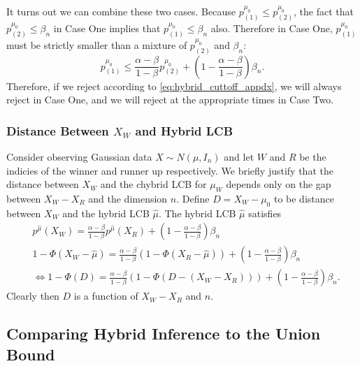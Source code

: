 \documentclass{article}
\begin{document}
\begin{appendix}
It turns out we can combine these two cases. Because $p^{\mu_0}_{(1)} \leq p^{\mu_0}_{(2)}$, the fact that $p^{\mu_0}_{(2)} \leq  \beta_n$ in Case One implies that $p^{\mu_0}_{(1)} \leq \beta_n$ also. Therefore in Case One, $p^{\mu_0}_{(1)}$ must be strictly smaller than a mixture of $p^{\mu_0}_{(2)}$ and $\beta_n$:
\begin{equation}
    \label{eq:hybrid_cuttoff_appdx}
    p^{\mu_0}_{(1)} \leq  \frac{\alpha-\beta}{1-\beta}p^{\mu_0}_{(2)}  + \left(1 - \frac{\alpha - \beta}{1 - \beta}\right)\beta_n. 
\end{equation}
Therefore, if we reject according to \eqref{eq:hybrid_cuttoff_appdx}, we will always reject in Case One, and we will reject at the appropriate times in Case Two. 

\subsubsection{Distance Between $X_W$ and Hybrid LCB}
\label{sec:hybrid_gap_appdx}

Consider observing Gaussian data $X \sim N(\mu, I_n)$ and let $W$ and $R$ be the indicies of the winner and runner up respectively. We briefly justify that the distance between $X_W$ and the chybrid LCB for $\mu_W$ depends only on the gap between $X_W - X_R$ and the dimension $n$. Define $D = X_W - \mu_0$ to be distance between $X_W$ and the hybrid LCB $\hat{\mu}$. The hybrid LCB $\hat{\mu}$ satisfies 
\begin{align*}
    & p^{\hat{\mu}}(X_W) = \frac{\alpha-\beta}{1-\beta} p^{\hat{\mu}}(X_R) + \left(1 - \frac{\alpha-\beta}{1-\beta} \right)\beta_n\\
    & 1 - \Phi(X_W - \hat{\mu}) = \frac{\alpha-\beta}{1-\beta} (1 - \Phi(X_R - \hat{\mu})) + \left(1 - \frac{\alpha-\beta}{1-\beta} \right)\beta_n\\ 
    &\iff 1 - \Phi(D) = \frac{\alpha-\beta}{1-\beta} (1 - \Phi(D - (X_W - X_R))) + \left(1 - \frac{\alpha-\beta}{1-\beta} \right)\beta_n.
\end{align*}
Clearly then $D$ is a function of $X_W - X_R$ and $n$.

\subsection{Comparing Hybrid Inference to the Union Bound}
\label{sec:hybrid_sim_appdx}


\end{appendix}
\end{document}
